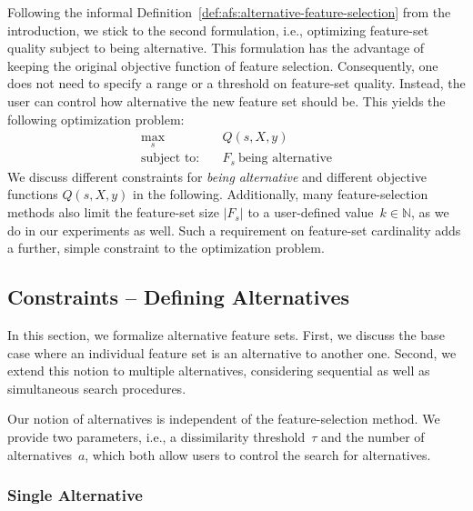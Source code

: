 \documentclass{article}
\theoremstyle{definition}
\begin{document}
Following the informal Definition~\ref{def:afs:alternative-feature-selection} from the introduction, we stick to the second formulation, i.e., optimizing feature-set quality subject to being alternative.
This formulation has the advantage of keeping the original objective function of feature selection.
Consequently, one does not need to specify a range or a threshold on feature-set quality.
Instead, the user can control how alternative the new feature set should be.
This yields the following optimization problem:
%
\begin{equation}
	\begin{aligned}
		\max_s &\quad Q(s,X,y) \\
		\text{subject to:} &\quad F_s~\text{being alternative}
	\end{aligned}
	\label{eq:afs:afs-general}
\end{equation}
%
We discuss different constraints for \emph{being alternative} and different objective functions $Q(s,X,y)$ in the following.
Additionally, many feature-selection methods also limit the feature-set size $|F_s|$ to a user-defined value~$k \in \mathbb{N}$, as we do in our experiments as well.
Such a requirement on feature-set cardinality adds a further, simple constraint to the optimization problem.

\subsection{Constraints -- Defining Alternatives}
\label{sec:afs:approach:constraints}

In this section, we formalize alternative feature sets.
First, we discuss the base case where an individual feature set is an alternative to another one.
Second, we extend this notion to multiple alternatives, considering sequential as well as simultaneous search procedures.

Our notion of alternatives is independent of the feature-selection method.
We provide two parameters, i.e., a dissimilarity threshold~$\tau$ and the number of alternatives~$a$, which both allow users to control the search for alternatives.

\subsubsection{Single Alternative}
\label{sec:afs:approach:constraints:single}
\end{document}
